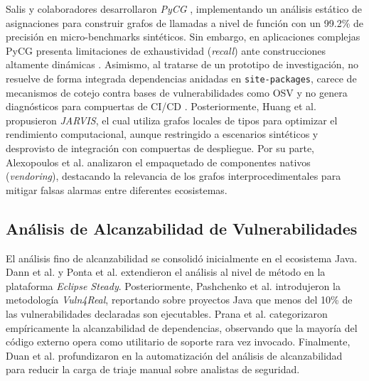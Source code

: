 \documentclass[conference]{IEEEtran}
\begin{document}
Salis y colaboradores desarrollaron \textit{PyCG} \cite{salis2021pycg}, implementando un análisis estático de asignaciones para construir grafos de llamadas a nivel de función con un 99.2\% de precisión en micro-benchmarks sintéticos. Sin embargo, en aplicaciones complejas PyCG presenta limitaciones de exhaustividad (\textit{recall}) ante construcciones altamente dinámicas . Asimismo, al tratarse de un prototipo de investigación, no resuelve de forma integrada dependencias anidadas en \texttt{site-packages}, carece de mecanismos de cotejo contra bases de vulnerabilidades como OSV y no genera diagnósticos para compuertas de CI/CD \cite{salis2021pycg}. Posteriormente, Huang et al. \cite{sotiropoulos2023jarvis} propusieron \textit{JARVIS}, el cual utiliza grafos locales de tipos para optimizar el rendimiento computacional, aunque restringido a escenarios sintéticos y desprovisto de integración con compuertas de despliegue. Por su parte, Alexopoulos et al. \cite{alexopoulos2026cross} analizaron el empaquetado de componentes nativos (\textit{vendoring}), destacando la relevancia de los grafos interprocedimentales para mitigar falsas alarmas entre diferentes ecosistemas.

\subsection{Análisis de Alcanzabilidad de Vulnerabilidades}
El análisis fino de alcanzabilidad se consolidó inicialmente en el ecosistema Java. Dann et al. \cite{dann2021identifying} y Ponta et al. \cite{ponta2020detection} extendieron el análisis al nivel de método en la plataforma \textit{Eclipse Steady}. Posteriormente, Pashchenko et al. \cite{pashchenko2022vuln4real} introdujeron la metodología \textit{Vuln4Real}, reportando sobre proyectos Java que menos del 10\% de las vulnerabilidades declaradas son ejecutables. Prana et al. \cite{prana2022empirical} categorizaron empíricamente la alcanzabilidad de dependencias, observando que la mayoría del código externo opera como utilitario de soporte rara vez invocado. Finalmente, Duan et al. \cite{duan2023towards} profundizaron en la automatización del análisis de alcanzabilidad para reducir la carga de triaje manual sobre analistas de seguridad.
\end{document}

